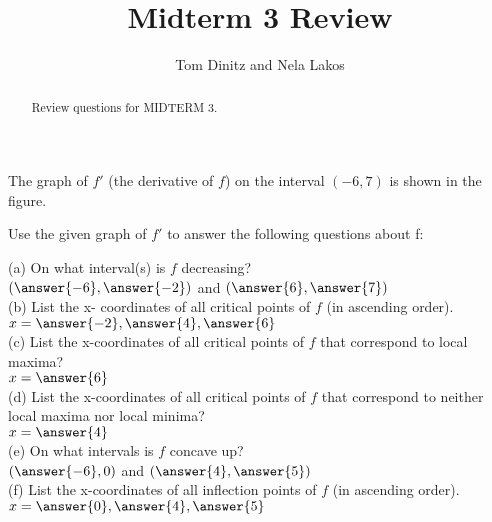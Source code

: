 \documentclass{ximera}
\author{Tom Dinitz and Nela Lakos}
\title{Midterm 3 Review}
\begin{document}
\begin{abstract}
Review questions for MIDTERM 3.
\end{abstract}
\maketitle

\begin{exercise}
The graph of $f'$ (the derivative of $f$) on the interval $(-6,7)$ is shown in the figure.

\begin{image}
\end{image}



Use the given graph of $f'$ to answer the following questions about f:

(a) On what interval(s) is $f$ decreasing?\\

$(\answer{-6},\answer{-2})$ and $(\answer{6},\answer{7})$\\

(b) List the x- coordinates of all critical points of $f$ (in ascending order). \\

$x=\answer{-2},\answer{4},\answer{6}$\\

(c) List the x-coordinates of all critical points of $f$ that correspond to local maxima?\\

$x=\answer{6}$\\

(d)  List the x-coordinates of all critical points of $f$ that correspond to neither local maxima nor local minima? \\

$x=\answer{4}$\\

(e) On what intervals is $f$ concave up?\\

$(\answer{-6},0)$ and $(\answer{4},\answer{5})$\\

(f) List the x-coordinates of  all inflection points of $f$ (in ascending order). \\

$x=\answer{0},\answer{4},\answer{5}$\\
\end{exercise}
\end{document}
